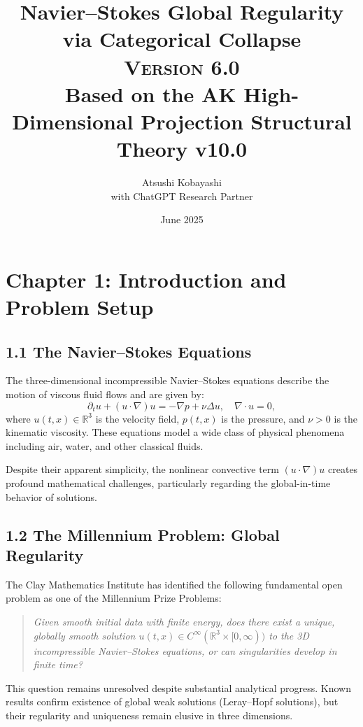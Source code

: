 \documentclass[11pt]{article}
\title{Navier–Stokes Global Regularity via Categorical Collapse\\
\Large \textsc{Version 6.0}\\
\small Based on the AK High-Dimensional Projection Structural Theory v10.0}
\author{Atsushi Kobayashi \\ \small with ChatGPT Research Partner}
\date{June 2025}
\begin{document}
\maketitle
\tableofcontents
\newpage




\section{Chapter 1: Introduction and Problem Setup}

\subsection{1.1 The Navier--Stokes Equations}

The three-dimensional incompressible Navier--Stokes equations describe the motion of viscous fluid flows and are given by:
\[
\partial_t u + (u \cdot \nabla)u = -\nabla p + \nu \Delta u, \quad \nabla \cdot u = 0,
\]
where \( u(t,x) \in \mathbb{R}^3 \) is the velocity field, \( p(t,x) \) is the pressure, and \( \nu > 0 \) is the kinematic viscosity. These equations model a wide class of physical phenomena including air, water, and other classical fluids.

Despite their apparent simplicity, the nonlinear convective term \( (u \cdot \nabla)u \) creates profound mathematical challenges, particularly regarding the global-in-time behavior of solutions.

\subsection{1.2 The Millennium Problem: Global Regularity}

The Clay Mathematics Institute has identified the following fundamental open problem as one of the Millennium Prize Problems:

\begin{quote}
\textit{Given smooth initial data with finite energy, does there exist a unique, globally smooth solution \( u(t,x) \in C^\infty(\mathbb{R}^3 \times [0,\infty)) \) to the 3D incompressible Navier--Stokes equations, or can singularities develop in finite time?}
\end{quote}

This question remains unresolved despite substantial analytical progress. Known results confirm existence of global weak solutions (Leray–Hopf solutions), but their regularity and uniqueness remain elusive in three dimensions.
\end{document}
